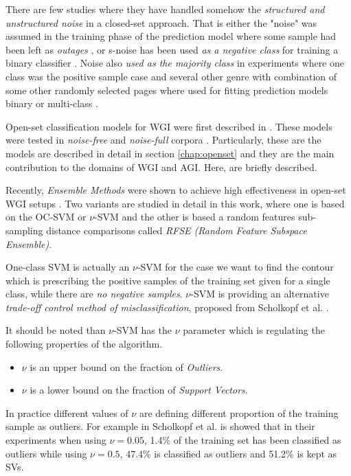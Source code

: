 There are few studies where they have handled somehow the \textit{structured and unstructured noise} in a closed-set approach. That is either the "noise" was assumed in the training phase of the prediction model where some sample had been left as \textit{outages} \parencite{jebari2015combination}, or s-noise has been used \textit{as a negative class} for training a binary classifier \parencite{Vidulin2007}. Noise also\textit{ used as the majority class} in experiments where one class was the positive sample case and several other genre with combination of some other randomly selected pages where used for fitting prediction models binary or multi-class \parencite{dong2006binary,levering2008using}. 

Open-set classification models for WGI were first described in \parencite{pritsos2013open,stubbe2007genre}. These models were tested in \textit{noise-free} and \textit{noise-full} corpora \parencite{pritsos2015clef,pritsos2018open,pritsos2019open}. Particularly, these are the models are described in detail in section \ref{chap:openset} and they are the main contribution to the domains of WGI and AGI. Here, are briefly described.

Recently, \textit{Ensemble Methods} were shown to achieve high effectiveness in open-set WGI setups \parencite{pritsos2013open,pritsos2015clef,pritsos2018open,pritsos2019open}. Two variants are studied in detail in this work, where one is based on the OC-SVM or $\nu$-SVM and the other is based a random features sub-sampling distance comparisons called \textit{RFSE (Random Feature Subspace Ensemble)}. 

One-class SVM is actually an $\nu$-SVM for the case we want to find the contour which is prescribing the positive samples of the training set given for a single class, while there are \textit{no negative samples}. $\nu$-SVM is providing an alternative \textit{trade-off control method of misclassification}, proposed from Scholkopf et al. . 

It should be noted than $\nu$-SVM has the $\nu$ parameter which is regulating the following properties of the algorithm.
\begin{itemize}
\item $\nu$ is an upper bound on the fraction of \textit{Outliers}.
\item $\nu$ is a lower bound on the fraction of \textit{Support Vectors}.
\end{itemize}

In practice different values of $\nu$ are defining different proportion of the training sample as outliers. For example in Scholkopf et al.  is showed that in their experiments when using $\nu=0.05$, 1.4\% of the training set has been classified as outliers while using $\nu=0.5$, 47.4\% is classified as outliers and 51.2\% is kept as SVs.


